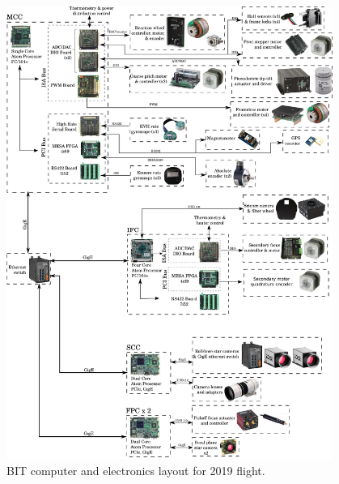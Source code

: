 \begin{figure}
    \begin{small}
        \begin{center}
            \includegraphics[width=0.95\textwidth]{Hardware/figs/electronics.png}
        \end{center}
        \caption{BIT computer and electronics layout for 2019 flight.}
        \label{fig:electronics}
    \end{small}
\end{figure}

